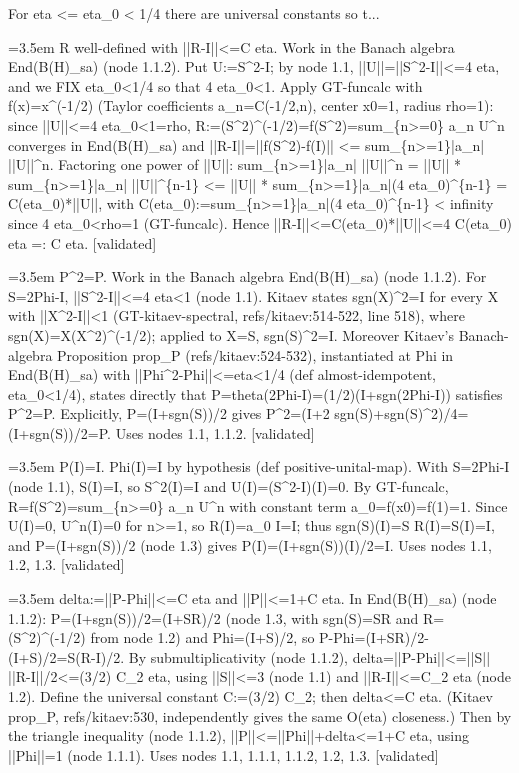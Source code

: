 \documentclass{article}
\newcommand{\step}[1]{\par\noindent\hangindent=3.5em\hangafter=1%
  \makebox[3.5em][l]{\textbf{#1.}}}
\newcommand{\steptag}[1]{\hfill{\small\textsf{[#1]}}}
\begin{document}
\begin{proofbox}{For eta <= eta\_0 < 1/4 there are universal constants so t...}
\step{1.2} R well-defined with ||R-I||<=C eta. Work in the Banach algebra End(B(H)\_sa) (node 1.1.2). Put U:=S\textasciicircum{}2-I; by node 1.1, ||U||=||S\textasciicircum{}2-I||<=4 eta, and we FIX eta\_0<1/4 so that 4 eta\_0<1. Apply GT-funcalc with f(x)=x\textasciicircum{}(-1/2) (Taylor coefficients a\_n=C(-1/2,n), center x0=1, radius rho=1): since ||U||<=4 eta\_0<1=rho, R:=(S\textasciicircum{}2)\textasciicircum{}(-1/2)=f(S\textasciicircum{}2)=sum\_\{n>=0\} a\_n U\textasciicircum{}n converges in End(B(H)\_sa) and ||R-I||=||f(S\textasciicircum{}2)-f(I)|| <= sum\_\{n>=1\}|a\_n| ||U||\textasciicircum{}n. Factoring one power of ||U||: sum\_\{n>=1\}|a\_n| ||U||\textasciicircum{}n = ||U|| * sum\_\{n>=1\}|a\_n| ||U||\textasciicircum{}\{n-1\} <= ||U|| * sum\_\{n>=1\}|a\_n|(4 eta\_0)\textasciicircum{}\{n-1\} = C(eta\_0)*||U||, with C(eta\_0):=sum\_\{n>=1\}|a\_n|(4 eta\_0)\textasciicircum{}\{n-1\} < infinity since 4 eta\_0<rho=1 (GT-funcalc). Hence ||R-I||<=C(eta\_0)*||U||<=4 C(eta\_0) eta =: C eta. \steptag{validated} \\[4pt]
\step{1.3} P\textasciicircum{}2=P. Work in the Banach algebra End(B(H)\_sa) (node 1.1.2). For S=2Phi-I, ||S\textasciicircum{}2-I||<=4 eta<1 (node 1.1). Kitaev states sgn(X)\textasciicircum{}2=I for every X with ||X\textasciicircum{}2-I||<1 (GT-kitaev-spectral, refs/kitaev:514-522, line 518), where sgn(X)=X(X\textasciicircum{}2)\textasciicircum{}(-1/2); applied to X=S, sgn(S)\textasciicircum{}2=I. Moreover Kitaev's Banach-algebra Proposition prop\_P (refs/kitaev:524-532), instantiated at Phi in End(B(H)\_sa) with ||Phi\textasciicircum{}2-Phi||<=eta<1/4 (def almost-idempotent, eta\_0<1/4), states directly that P=theta(2Phi-I)=(1/2)(I+sgn(2Phi-I)) satisfies P\textasciicircum{}2=P. Explicitly, P=(I+sgn(S))/2 gives P\textasciicircum{}2=(I+2 sgn(S)+sgn(S)\textasciicircum{}2)/4=(I+sgn(S))/2=P. Uses nodes 1.1, 1.1.2. \steptag{validated} \\[4pt]
\step{1.4} P(I)=I. Phi(I)=I by hypothesis (def positive-unital-map). With S=2Phi-I (node 1.1), S(I)=I, so S\textasciicircum{}2(I)=I and U(I)=(S\textasciicircum{}2-I)(I)=0. By GT-funcalc, R=f(S\textasciicircum{}2)=sum\_\{n>=0\} a\_n U\textasciicircum{}n with constant term a\_0=f(x0)=f(1)=1. Since U(I)=0, U\textasciicircum{}n(I)=0 for n>=1, so R(I)=a\_0 I=I; thus sgn(S)(I)=S R(I)=S(I)=I, and P=(I+sgn(S))/2 (node 1.3) gives P(I)=(I+sgn(S))(I)/2=I. Uses nodes 1.1, 1.2, 1.3. \steptag{validated} \\[4pt]
\step{1.5} delta:=||P-Phi||<=C eta and ||P||<=1+C eta. In End(B(H)\_sa) (node 1.1.2): P=(I+sgn(S))/2=(I+SR)/2 (node 1.3, with sgn(S)=SR and R=(S\textasciicircum{}2)\textasciicircum{}(-1/2) from node 1.2) and Phi=(I+S)/2, so P-Phi=(I+SR)/2-(I+S)/2=S(R-I)/2. By submultiplicativity (node 1.1.2), delta=||P-Phi||<=||S|| ||R-I||/2<=(3/2) C\_2 eta, using ||S||<=3 (node 1.1) and ||R-I||<=C\_2 eta (node 1.2). Define the universal constant C:=(3/2) C\_2; then delta<=C eta. (Kitaev prop\_P, refs/kitaev:530, independently gives the same O(eta) closeness.) Then by the triangle inequality (node 1.1.2), ||P||<=||Phi||+delta<=1+C eta, using ||Phi||=1 (node 1.1.1). Uses nodes 1.1, 1.1.1, 1.1.2, 1.2, 1.3. \steptag{validated} \\[4pt]

\end{proofbox}
\end{document}
